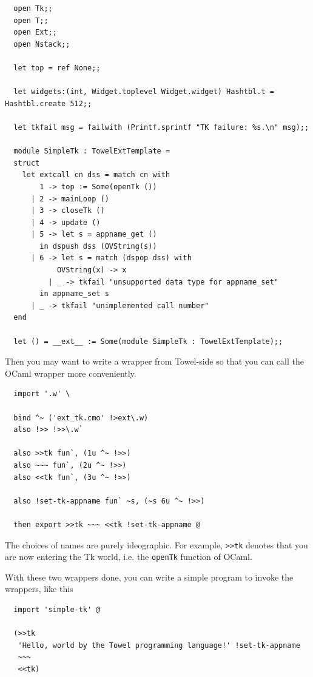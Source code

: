 \documentclass{report}
\begin{document}
\begin{mdframed}[style=cl]
  \begin{verbatim}
  open Tk;;
  open T;;
  open Ext;;
  open Nstack;;

  let top = ref None;;

  let widgets:(int, Widget.toplevel Widget.widget) Hashtbl.t = Hashtbl.create 512;;

  let tkfail msg = failwith (Printf.sprintf "TK failure: %s.\n" msg);;

  module SimpleTk : TowelExtTemplate =
  struct
    let extcall cn dss = match cn with
        1 -> top := Some(openTk ())
      | 2 -> mainLoop ()
      | 3 -> closeTk ()
      | 4 -> update ()
      | 5 -> let s = appname_get ()
        in dspush dss (OVString(s))
      | 6 -> let s = match (dspop dss) with
            OVString(x) -> x
          | _ -> tkfail "unsupported data type for appname_set"
        in appname_set s
      | _ -> tkfail "unimplemented call number"
  end

  let () = __ext__ := Some(module SimpleTk : TowelExtTemplate);;
  \end{verbatim}
\end{mdframed}

Then you may want to write a wrapper from Towel-side so that you can call the OCaml wrapper more conveniently.

\begin{mdframed}[style=cl]
\begin{verbatim}
  import '.w' \

  bind ^~ ('ext_tk.cmo' !>ext\.w)
  also !>> !>>\.w`

  also >>tk fun`, (1u ^~ !>>)
  also ~~~ fun`, (2u ^~ !>>)
  also <<tk fun`, (3u ^~ !>>)

  also !set-tk-appname fun` ~s, (~s 6u ^~ !>>)

  then export >>tk ~~~ <<tk !set-tk-appname @
\end{verbatim}
\end{mdframed}

The choices of names are purely ideographic. For example, \texttt{>>tk} denotes that you are now entering the Tk world, i.e. the \texttt{openTk} function of OCaml.

With these two wrappers done, you can write a simple program to invoke the wrappers, like this

\begin{mdframed}[style=example]
\begin{verbatim}
  import 'simple-tk' @

  (>>tk
   'Hello, world by the Towel programming language!' !set-tk-appname
   ~~~
   <<tk)
\end{verbatim}
\end{mdframed}
\end{document}
